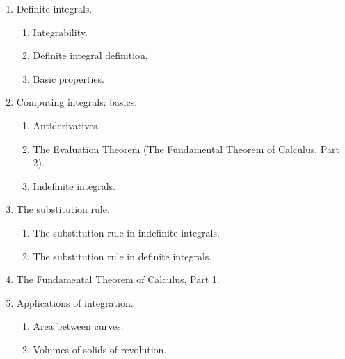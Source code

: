 \documentclass{article}
\begin{document}
\begin{enumerate}[label*=\arabic*.]
\begin{enumerate}[label*=\arabic*.]
\item Definite integrals.
\begin{enumerate}[label*=\arabic*.]
\item Integrability. 
\item Definite integral definition.
\item Basic properties.
\end{enumerate}
\item Computing integrals: basics. 
\begin{enumerate}[label*=\arabic*.]
\item Antiderivatives. 
\item The Evaluation Theorem (The Fundamental Theorem of Calculus, Part 2). 
\item Indefinite integrals.
\end{enumerate}
\item The substitution rule.
\begin{enumerate}[label*=\arabic*.]
\item The substitution rule in indefinite integrals.
\item The substitution rule in definite integrals.
\end{enumerate}
\item The Fundamental Theorem of Calculus, Part 1.
\item Applications of integration.
\begin{enumerate}[label*=\arabic*.]
\item Area between curves.
\item Volumes of solids of revolution.
\end{enumerate}
\end{enumerate}
\end{enumerate}
\end{document}

